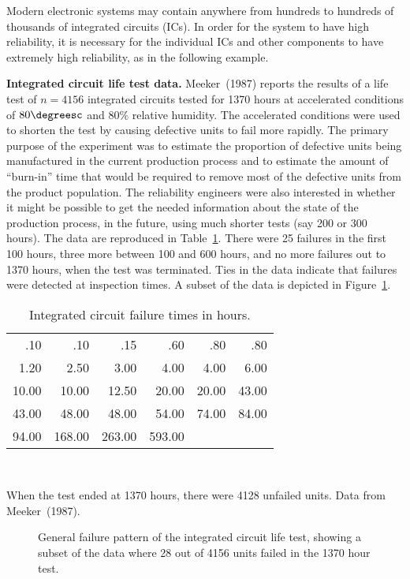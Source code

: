 Modern electronic systems may contain anywhere from hundreds to
hundreds of thousands of integrated circuits (ICs). In order for the
system to have high reliability, it is necessary for the individual
ICs and other components to have extremely high reliability, as in the
following example.

\begin{example}
\label{example:lfp.data}
{\bf Integrated circuit life test data.} Meeker~(1987) reports the
results of a life test of $n=4156$ integrated circuits tested for
1370 hours at accelerated conditions of $80 \degreesc$ and 80\%
relative humidity.  The accelerated conditions were used to shorten
the test by causing defective units to fail more rapidly. 
The primary purpose of the
experiment was to estimate the proportion of defective units being
manufactured in the current production process and to estimate the
amount of ``burn-in'' time that would be required to remove most of
the defective units from the product population.  The reliability
engineers were also interested in whether it might be possible to get
the needed information about the state of the production process, in
the future, using much shorter tests (say 200 or 300 hours).
The data are
reproduced in Table~\ref{table:lfp.data}.  There were 25 failures in
the first 100 hours, three more between 100 and 600 hours, and no more
failures out to 1370 hours, when the test was terminated. Ties in the
data indicate that failures were detected at inspection times. A
subset of the data is depicted in
Figure~\ref{figure:lfp.censoringfig.ps}.  
\begin{table}
\caption{Integrated circuit failure times in hours.}
\centering\small
\begin{tabular}{*{6}{r}}
\\[-.5ex]
\hline
 .10 & .10 & .15 & .60 & .80& .80\\ 
1.20 & 2.50 & 3.00 & 4.00 & 4.00 & 6.00 \\ 
10.00 & 10.00 & 12.50 & 20.00 & 20.00 & 43.00\\ 
43.00 & 48.00 & 48.00 & 54.00 & 74.00 & 84.00  \\ 
94.00  & 168.00 & 263.00 & 593.00\\
\hline
\end{tabular}\\
\begin{minipage}[t]{4in}
When the test ended at 1370 hours, there were 
4128 unfailed units. Data from Meeker~(1987).
\end{minipage}
\label{table:lfp.data}
\end{table}
\begin{figure}
\caption{General failure pattern of the integrated circuit life test,
showing a subset of the data
where 28 out of 4156 units failed in the 1370 hour test.}
\label{figure:lfp.censoringfig.ps}
\end{figure}
\end{example}

